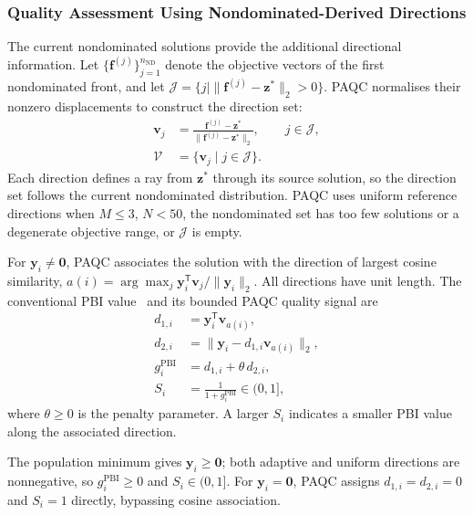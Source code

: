 \documentclass[final,5p,times,twocolumn]{elsarticle}
\newcommand{\vf}{\mathbf{f}}
\newcommand{\vy}{\mathbf{y}}
\newcommand{\vv}{\mathbf{v}}
\newcommand{\vz}{\mathbf{z}}
\begin{document}
\subsubsection{Quality Assessment Using Nondominated-Derived Directions}
\label{sec:method:paqc:cont}

The current nondominated solutions provide the additional directional information.
Let $\{\vf^{(j)}\}_{j=1}^{n_{\mathrm{ND}}}$ denote the objective vectors of
the first nondominated front, and let
$\mathcal{J}=\{j\mid\|\vf^{(j)}-\vz^{*}\|_2>0\}$.
PAQC normalises their nonzero displacements to construct the direction set:
\begin{equation}
\begin{aligned}
\vv_j&=\frac{\vf^{(j)}-\vz^{*}}{\|\vf^{(j)}-\vz^{*}\|_2},
\qquad j\in\mathcal{J},\\
\mathcal{V}&=\{\vv_j\mid j\in\mathcal{J}\}.
\end{aligned}
\label{eq:direction}
\end{equation}
Each direction defines a ray from $\vz^{*}$ through its source solution, so the
direction set follows the current nondominated distribution. PAQC uses uniform
reference directions when $M\leq3$, $N<50$, the nondominated set has too few
solutions or a degenerate objective range, or $\mathcal{J}$ is empty.

For $\vy_i\ne\boldsymbol{0}$, PAQC associates the solution with the direction
of largest cosine similarity,
$a(i)=\arg\max_j\vy_i^{\mathsf T}\vv_j/\|\vy_i\|_2$.
All directions have unit length. The conventional
PBI value~\cite{ref:moead} and its bounded PAQC quality signal are
\begin{equation}
\begin{aligned}
d_{1,i}&=\vy_i^{\mathsf T}\vv_{a(i)},\\
d_{2,i}&=\|\vy_i-d_{1,i}\vv_{a(i)}\|_2,\\
g_i^{\mathrm{PBI}}&=d_{1,i}+\theta\,d_{2,i},\\
S_i&=\frac{1}{1+g_i^{\mathrm{PBI}}}\in(0,1],
\end{aligned}
\label{eq:pbi}
\end{equation}
where $\theta\geq0$ is the penalty parameter. A larger $S_i$ indicates a smaller
PBI value along the associated direction.

The population minimum gives
$\vy_i\geq\boldsymbol{0}$; both adaptive and uniform directions are
nonnegative, so $g_i^{\mathrm{PBI}}\geq0$ and $S_i\in(0,1]$.
For $\vy_i=\boldsymbol{0}$, PAQC assigns $d_{1,i}=d_{2,i}=0$ and $S_i=1$
directly, bypassing cosine association.
\end{document}

